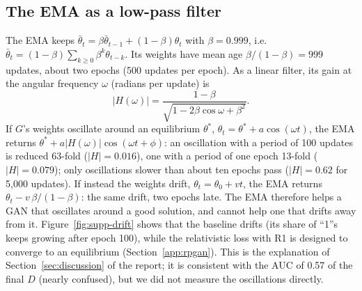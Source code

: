 \subsection{The EMA as a low-pass filter}
\label{app:ema}
The EMA keeps $\bar\theta_t=\beta\bar\theta_{t-1}+(1-\beta)\theta_t$ with $\beta=0.999$, i.e.\ $\bar\theta_t=(1-\beta)\sum_{k\ge0}\beta^k\theta_{t-k}$. Its weights have mean age $\beta/(1-\beta)=999$ updates, about two epochs (500 updates per epoch). As a linear filter, its gain at the angular frequency $\omega$ (radians per update) is
\begin{equation}
  |H(\omega)|=\frac{1-\beta}{\sqrt{1-2\beta\cos\omega+\beta^2}} .
\end{equation}
If $G$'s weights oscillate around an equilibrium $\theta^*$, $\theta_t=\theta^*+a\cos(\omega t)$, the EMA returns $\theta^*+a|H(\omega)|\cos(\omega t+\phi)$: an oscillation with a period of 100 updates is reduced 63-fold ($|H|=0.016$), one with a period of one epoch 13-fold ($|H|=0.079$); only oscillations slower than about ten epochs pass ($|H|=0.62$ for 5,000 updates). If instead the weights drift, $\theta_t=\theta_0+vt$, the EMA returns $\theta_t-v\,\beta/(1-\beta)$: the same drift, two epochs late. The EMA therefore helps a GAN that oscillates around a good solution, and cannot help one that drifts away from it. Figure~\ref{fig:supp-drift} shows that the baseline drifts (its share of ``1''s keeps growing after epoch 100), while the relativistic loss with R1 is designed to converge to an equilibrium (Section~\ref{app:rpgan}). This is the explanation of Section~\ref{sec:discussion} of the report; it is consistent with the AUC of 0.57 of the final $D$ (nearly confused), but we did not measure the oscillations directly.

